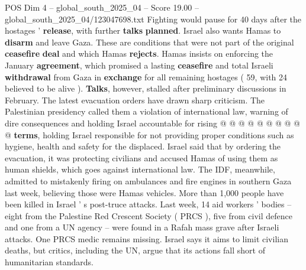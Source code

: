 \begin{textsample}{POS Dim 4 – global\_south\_2025\_04 – Score 19.00 – global\_south\_2025\_04/123047698.txt}
Fighting would pause for 40 days after the hostages ' \textbf{release}, with further \textbf{talks} \textbf{planned}.
Israel also wants Hamas to \textbf{disarm} and leave Gaza.
These are conditions that were not part of the original \textbf{ceasefire} \textbf{deal} and which Hamas \textbf{rejects}.
Hamas insists on enforcing the January \textbf{agreement}, which promised a lasting \textbf{ceasefire} and total Israeli \textbf{withdrawal} from Gaza in \textbf{exchange} for all remaining hostages ( 59, with 24 believed to be alive ). \textbf{Talks}, however, stalled after preliminary discussions in February.
The latest evacuation orders have drawn sharp criticism.
The Palestinian presidency called them a violation of international law, warning of dire consequences and holding Israel accountable for rising @ @ @ @ @ @ @ @ @ @ \textbf{terms}, holding Israel responsible for not providing proper conditions such as hygiene, health and safety for the displaced.
Israel said that by ordering the evacuation, it was protecting civilians and accused Hamas of using them as human shields, which goes against international law.
The IDF, meanwhile, admitted to mistakenly firing on ambulances and fire engines in southern Gaza last week, believing those were Hamas vehicles.
More than 1,000 people have been killed in Israel ' s post-truce attacks.
Last week, 14 aid workers ' bodies -- eight from the Palestine Red Crescent Society ( PRCS ), five from civil defence and one from a UN agency -- were found in a Rafah mass grave after Israeli attacks.
One PRCS medic remains missing.
Israel says it aims to limit civilian deaths, but critics, including the UN, argue that its actions fall short of humanitarian standards.

\end{textsample}
